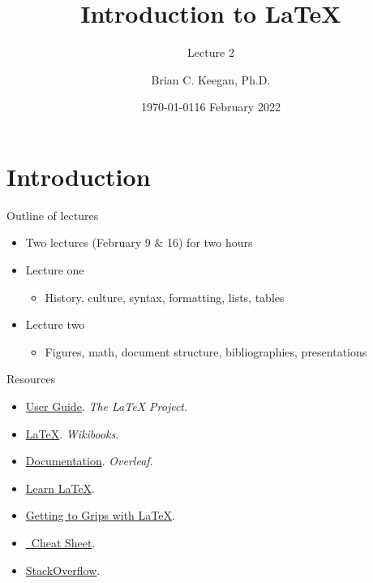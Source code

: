 \documentclass{cubeamer}
\title{Introduction to \LaTeX}
\subtitle{Lecture 2}
\author[B. Keegan]{Brian C. Keegan, Ph.D.}
\date{\today} %
\institute[Information Science]{Assistant Professor, Department of Information Science}
\date{16 February 2022}
\begin{document}
\maketitle


\section{Introduction}

\begin{frame}{Outline of lectures}
    \begin{itemize}
        \item Two lectures (February 9 \& 16) for two hours
        \item Lecture one
        \begin{itemize}
            \item History, culture, syntax, formatting, lists, tables
        \end{itemize}
        \item Lecture two
        \begin{itemize}
            \item Figures, math, document structure, bibliographies, presentations
        \end{itemize}
    \end{itemize}
\end{frame}

\begin{frame}{Resources}
    \begin{itemize}
        \item \href{https://www.latex-project.org/help/documentation/usrguide.pdf}{User Guide}. \textit{The \LaTeX{} Project}.
        \item \href{https://en.wikibooks.org/wiki/LaTeX}{\LaTeX}. \textit{Wikibooks}.
        \item \href{https://www.overleaf.com/learn}{Documentation}. \textit{Overleaf}.
        \item \href{https://www.learnlatex.org/en/}{Learn \LaTeX}.
        \item \href{https://www.andy-roberts.net/writing/latex}{Getting to Grips with \LaTeX}.
        \item \href{http://wch.github.io/latexsheet/latexsheet.pdf}{\LaTeXe~Cheat Sheet}.
        \item \href{https://tex.stackexchange.com/}{StackOverflow}.
    \end{itemize}
\end{frame}
\end{document}
